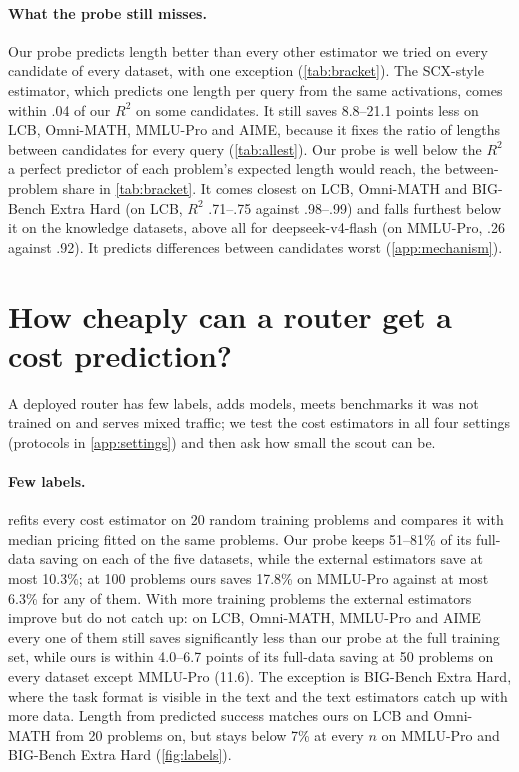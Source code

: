 \documentclass[10pt]{article}
\begin{document}
\paragraph{What the probe still misses.}
Our probe predicts length better than every other estimator we tried on every candidate of every dataset, with one exception (\cref{tab:bracket}). The SCX-style estimator, which predicts one length per query from the same activations, comes within .04 of our $R^2$ on some candidates. It still saves 8.8--21.1 points less on LCB, Omni-MATH, MMLU-Pro and AIME, because it fixes the ratio of lengths between candidates for every query (\cref{tab:allest}). Our probe is well below the $R^2$ a perfect predictor of each problem's expected length would reach, the between-problem share in \cref{tab:bracket}. It comes closest on LCB, Omni-MATH and BIG-Bench Extra Hard (on LCB, $R^2$ .71--.75 against .98--.99) and falls furthest below it on the knowledge datasets, above all for deepseek-v4-flash (on MMLU-Pro, .26 against .92). It predicts differences between candidates worst (\cref{app:mechanism}).

\section{How cheaply can a router get a cost prediction?}\label{sec:general}
A deployed router has few labels, adds models, meets benchmarks it was not trained on and serves mixed traffic; we test the cost estimators in all four settings (protocols in \cref{app:settings}) and then ask how small the scout can be.

\paragraph{Few labels.}
 refits every cost estimator on 20 random training problems and compares it with median pricing fitted on the same problems. Our probe keeps 51--81\% of its full-data saving on each of the five datasets, while the external estimators save at most 10.3\%; at 100 problems ours saves 17.8\% on MMLU-Pro against at most 6.3\% for any of them. With more training problems the external estimators improve but do not catch up: on LCB, Omni-MATH, MMLU-Pro and AIME every one of them still saves significantly less than our probe at the full training set, while ours is within 4.0--6.7 points of its full-data saving at 50 problems on every dataset except MMLU-Pro (11.6). The exception is BIG-Bench Extra Hard, where the task format is visible in the text and the text estimators catch up with more data. Length from predicted success matches ours on LCB and Omni-MATH from 20 problems on, but stays below 7\% at every $n$ on MMLU-Pro and BIG-Bench Extra Hard (\cref{fig:labels}).
\end{document}
